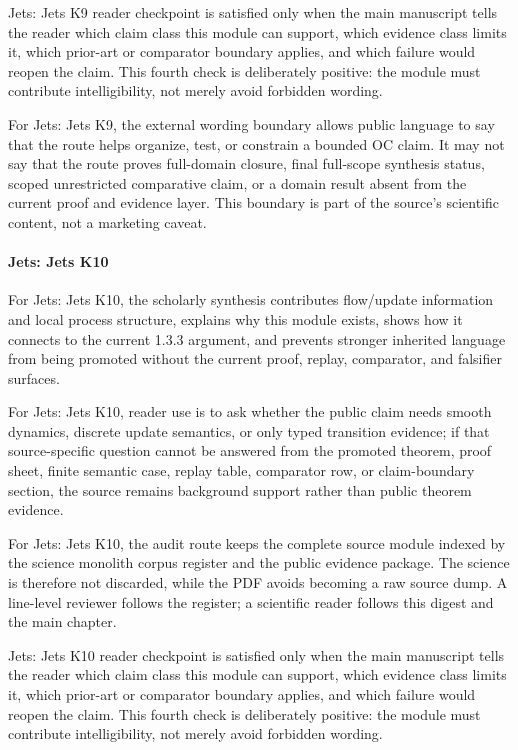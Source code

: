Jets: Jets K9 reader checkpoint is satisfied only when the main manuscript tells the reader which claim class this module can support, which evidence class limits it, which prior-art or comparator boundary applies, and which failure would reopen the claim. This fourth check is deliberately positive: the module must contribute intelligibility, not merely avoid forbidden wording.


For Jets: Jets K9, the external wording boundary allows public language to say that the route helps organize, test, or constrain a bounded OC claim. It may not say that the route proves full-domain closure, final full-scope synthesis status, scoped unrestricted comparative claim, or a domain result absent from the current proof and evidence layer. This boundary is part of the source's scientific content, not a marketing caveat.


\paragraph{Jets: Jets K10}

For Jets: Jets K10, the scholarly synthesis contributes flow/update information and local process structure, explains why this module exists, shows how it connects to the current 1.3.3 argument, and prevents stronger inherited language from being promoted without the current proof, replay, comparator, and falsifier surfaces.


For Jets: Jets K10, reader use is to ask whether the public claim needs smooth dynamics, discrete update semantics, or only typed transition evidence; if that source-specific question cannot be answered from the promoted theorem, proof sheet, finite semantic case, replay table, comparator row, or claim-boundary section, the source remains background support rather than public theorem evidence.


For Jets: Jets K10, the audit route keeps the complete source module indexed by the science monolith corpus register and the public evidence package. The science is therefore not discarded, while the PDF avoids becoming a raw source dump. A line-level reviewer follows the register; a scientific reader follows this digest and the main chapter.


Jets: Jets K10 reader checkpoint is satisfied only when the main manuscript tells the reader which claim class this module can support, which evidence class limits it, which prior-art or comparator boundary applies, and which failure would reopen the claim. This fourth check is deliberately positive: the module must contribute intelligibility, not merely avoid forbidden wording.


